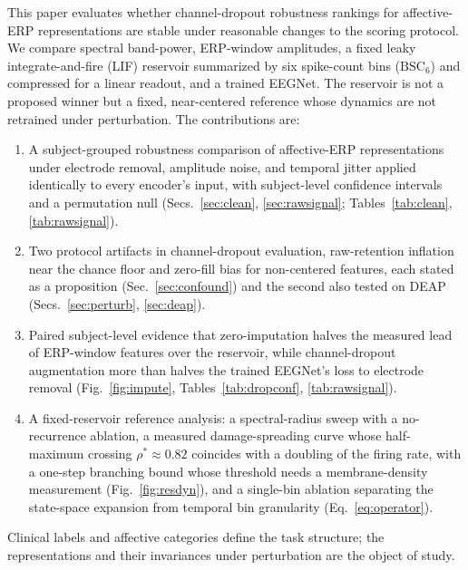 \documentclass[conference]{IEEEtran}
\newcommand{\BSC}{\ensuremath{\mathrm{BSC}_{6}}}
\begin{document}
This paper evaluates whether channel-dropout robustness rankings for affective-ERP representations are stable under reasonable changes to the scoring protocol. We compare spectral band-power, ERP-window amplitudes, a fixed leaky integrate-and-fire (LIF) reservoir summarized by six spike-count bins (\BSC{}) and compressed for a linear readout, and a trained EEGNet. The reservoir is not a proposed winner but a fixed, near-centered reference whose dynamics are not retrained under perturbation. The contributions are:
\begin{enumerate}
    \item A subject-grouped robustness comparison of affective-ERP representations under electrode removal, amplitude noise, and temporal jitter applied identically to every encoder's input, with subject-level confidence intervals and a permutation null (Secs.~\ref{sec:clean}, \ref{sec:rawsignal}; Tables~\ref{tab:clean}, \ref{tab:rawsignal}).
    \item Two protocol artifacts in channel-dropout evaluation, raw-retention inflation near the chance floor and zero-fill bias for non-centered features, each stated as a proposition (Sec.~\ref{sec:confound}) and the second also tested on DEAP (Secs.~\ref{sec:perturb}, \ref{sec:deap}).
    \item Paired subject-level evidence that zero-imputation halves the measured lead of ERP-window features over the reservoir, while channel-dropout augmentation more than halves the trained EEGNet's loss to electrode removal (Fig.~\ref{fig:impute}, Tables~\ref{tab:dropconf}, \ref{tab:rawsignal}).
    \item A fixed-reservoir reference analysis: a spectral-radius sweep with a no-recurrence ablation, a measured damage-spreading curve whose half-maximum crossing $\rho^\ast\approx0.82$ coincides with a doubling of the firing rate, with a one-step branching bound whose threshold needs a membrane-density measurement (Fig.~\ref{fig:resdyn}), and a single-bin ablation separating the state-space expansion from temporal bin granularity (Eq.~\eqref{eq:operator}).
\end{enumerate}
Clinical labels and affective categories define the task structure; the representations and their invariances under perturbation are the object of study.
\end{document}
